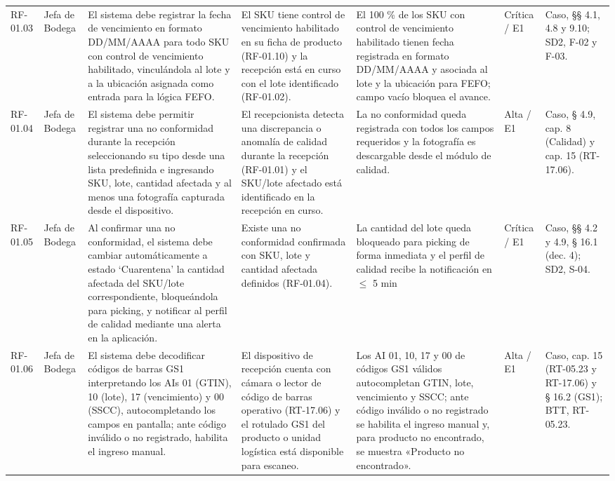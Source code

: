 {\begin{longtable}{@{}F{0.062} F{0.080} F{0.195} F{0.160} F{0.240} F{0.093} F{0.170}@{}}
  RF-01.03 & Jefa de Bodega & El sistema debe registrar la fecha de vencimiento en formato DD/MM/AAAA para todo SKU con control de vencimiento habilitado, vinculándola al lote y a la ubicación asignada como entrada para la lógica FEFO. & El SKU tiene control de vencimiento habilitado en su ficha de producto (RF-01.10) y la recepción está en curso con el lote identificado (RF-01.02). & El 100 \% de los SKU con control de vencimiento habilitado tienen fecha registrada en formato DD/MM/AAAA y asociada al lote y la ubicación para FEFO; campo vacío bloquea el avance. & Crítica / E1 & Caso, §§ 4.1, 4.8 y 9.10; SD2, F-02 y F-03. \\
  RF-01.04 & Jefa de Bodega & El sistema debe permitir registrar una no conformidad durante la recepción seleccionando su tipo desde una lista predefinida e ingresando SKU, lote, cantidad afectada y al menos una fotografía capturada desde el dispositivo. & El recepcionista detecta una discrepancia o anomalía de calidad durante la recepción (RF-01.01) y el SKU/lote afectado está identificado en la recepción en curso. & La no conformidad queda registrada con todos los campos requeridos y la fotografía es descargable desde el módulo de calidad. & Alta / E1 & Caso, § 4.9, cap. 8 (Calidad) y cap. 15 (RT-17.06). \\
  RF-01.05 & Jefa de Bodega & Al confirmar una no conformidad, el sistema debe cambiar automáticamente a estado ‘Cuarentena’ la cantidad afectada del SKU/lote correspondiente, bloqueándola para picking, y notificar al perfil de calidad mediante una alerta en la aplicación. & Existe una no conformidad confirmada con SKU, lote y cantidad afectada definidos (RF-01.04). & La cantidad del lote queda bloqueado para picking de forma inmediata y el perfil de calidad recibe la notificación en $\le$ 5 min & Crítica / E1 & Caso, §§ 4.2 y 4.9, § 16.1 (dec. 4); SD2, S-04. \\
  RF-01.06 & Jefa de Bodega & El sistema debe decodificar códigos de barras GS1 interpretando los AIs 01 (GTIN), 10 (lote), 17 (vencimiento) y 00 (SSCC), autocompletando los campos en pantalla; ante código inválido o no registrado, habilita el ingreso manual. & El dispositivo de recepción cuenta con cámara o lector de código de barras operativo (RT-17.06) y el rotulado GS1 del producto o unidad logística está disponible para escaneo. & Los AI 01, 10, 17 y 00 de códigos GS1 válidos autocompletan GTIN, lote, vencimiento y SSCC; ante código inválido o no registrado se habilita el ingreso manual y, para producto no encontrado, se muestra «Producto no encontrado». & Alta / E1 & Caso, cap. 15 (RT-05.23 y RT-17.06) y § 16.2 (GS1); BTT, RT-05.23. \\

\end{longtable}}
